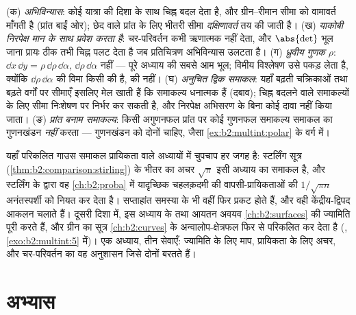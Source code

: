 \begin{remark}[सामान्य चूकें]
(क) \emph{अभिविन्यास}: कोई  यात्रा की दिशा के साथ चिह्न
बदल देता है, और ग्रीन--रीमान सीमा को वामावर्त माँगती है (प्रांत
बाईं ओर); छेद वाले प्रांत के लिए भीतरी सीमा \emph{दक्षिणावर्त} तय
की जाती है। (ख) \emph{याकोबी निरपेक्ष मान के साथ प्रवेश करता है}:
चर-परिवर्तन कभी ऋणात्मक  नहीं देता, और $\abs{\det}$ भूल जाना
प्रायः ठीक तभी चिह्न पलट देता है जब प्रतिचित्रण अभिविन्यास उलटता
है। (ग) \emph{ध्रुवीय गुणक $\rho$}: $\dd x\,\dd y = \rho\,\dd\rho\,\dd\alpha$, $\dd\rho\,\dd\alpha$ नहीं --- पूरे अध्याय
की सबसे आम भूल; विमीय विश्लेषण उसे पकड़ लेता है, क्योंकि $\dd\rho\,\dd\alpha$ की
विमा किसी  की है,  की नहीं। (घ) \emph{अनुचित द्विक
समाकल}: यहाँ बढ़ती चक्रिकाओं तथा बढ़ते वर्गों पर सीमाएँ इसलिए मेल
खाती हैं कि समाकल्य धनात्मक हैं (दबाव); चिह्न बदलने वाले समाकल्यों
के लिए सीमा निःशेषण पर निर्भर कर सकती है, और निरपेक्ष अभिसरण के
बिना कोई दावा नहीं किया जाता। (ङ) \emph{प्रांत बनाम समाकल्य}: किसी
अगुणनफल प्रांत पर कोई गुणनफल समाकल्य समाकल का गुणनखंडन \emph{नहीं}
करता --- गुणनखंडन को दोनों चाहिए, जैसा \cref{ex:b2:multint:polar} के वर्ग में।
\end{remark}

\begin{remark}[इस खंड के भीतर के परिप्रेक्ष्य]
यहाँ परिकलित गाउस समाकल प्रायिकता वाले अध्यायों में चुपचाप हर जगह
है: स्टर्लिंग सूत्र (\cref{thm:b2:comparison:stirling}) के भीतर का अचर $\sqrt\pi$ इसी अध्याय का समाकल
है, और स्टर्लिंग के द्वारा वह \cref{ch:b2:proba} में यादृच्छिक चहलक़दमी की
वापसी-प्रायिकताओं की $1/\sqrt{\pi n}$ अनंतस्पर्शी को नियत कर देता है। सप्ताहांत
समस्या के  भी वहीं फिर प्रकट होते हैं, और वही
केंद्रीय-द्विपद आकलन चलाते हैं। दूसरी दिशा में, इस अध्याय के
 तथा आयतन अवयव \cref{ch:b2:surfaces} की ज्यामिति पूरी करते हैं, और ग्रीन का
सूत्र \cref{ch:b2:curves} के अन्वालोप-क्षेत्रफल फिर से परिकलित कर देता है
(, \cref{exo:b2:multint:5} में)। एक अध्याय, तीन सेवाएँ: ज्यामिति के लिए माप,
प्रायिकता के लिए अचर, और चर-परिवर्तन का वह अनुशासन जिसे दोनों
बरतते हैं।
\end{remark}

\section{अभ्यास}

